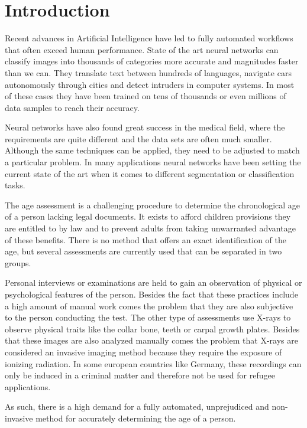 \section{Introduction}

Recent advances in Artificial Intelligence have led to fully automated workflows that often exceed human performance. State of the art neural networks can classify images into thousands of categories more accurate and magnitudes faster than we can. They translate text between hundreds of languages, navigate cars autonomously through cities and detect intruders in computer systems. In most of these cases they have been trained on tens of thousands or even millions of data samples to reach their accuracy. 

Neural networks have also found great success in the medical field, where the requirements are quite different and the data sets are often much smaller. Although the same techniques can be applied, they need to be adjusted to match a particular problem. In many applications neural networks have been setting the current state of the art when it comes to different segmentation or classification tasks.

The age assessment is a challenging procedure to determine the chronological age of a person lacking legal documents. It exists to afford children provisions they are entitled to by law and to prevent adults from taking unwarranted advantage of these benefits. There is no method that offers an exact identification of the age, but several assessments are currently used that can be separated in two groups.

Personal interviews or examinations are held to gain an observation of physical or psychological features of the person. Besides the fact that these practices include a high amount of manual work comes the problem that they are also subjective to the person conducting the test. The other type of assessments use X-rays to observe physical traits like the collar bone, teeth or carpal growth plates. Besides that these images are also analyzed manually comes the problem that X-rays are considered an invasive imaging method because they require the exposure of ionizing radiation. In some european countries like Germany, these recordings can only be induced in a criminal matter and therefore not be used for refugee applications.

As such, there is a high demand for a fully automated, unprejudiced and non-invasive method for accurately determining the age of a person.

